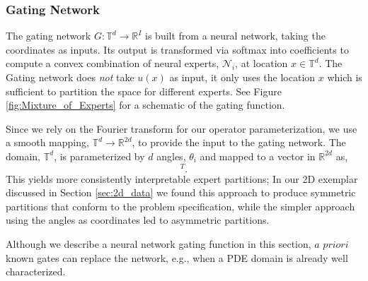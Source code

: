 \subsubsection{Gating Network}\label{sec:gates}

The gating network $G: \mathbb{T}^d \rightarrow \mathbb{R}^I$ is built from a neural network, taking the coordinates as inputs.
Its output is transformed via softmax into coefficients to compute a convex combination of neural experts, \(\mathcal{N}_i\), at location \(x \in \mathbb{T}^d\). The Gating network does \textit{not} take \(u(x)\) as input, it only uses the location \(x\) which is sufficient to partition the space for different experts. See Figure \ref{fig:Mixture_of_Experts} for a schematic of the gating function.



Since we rely on the Fourier transform for our operator parameterization, we use a smooth mapping, $\mathbb{T}^d \rightarrow \mathbb{R}^{2d}$, to provide the input to the gating network. The domain, $\mathbb{T}^d$, is parameterized by $d$ angles, $\theta_i$ and mapped to a vector in $\mathbb{R}^{2d}$ as, 
\begin{equation}
    [\sin(\theta_1), \hdots, \sin(\theta_d),\cos(\theta_1), \hdots, \cos(\theta_d)]^T.
\end{equation}
This yields more consistently interpretable expert partitions; In our 2D exemplar discussed in Section \ref{sec:2d_data} we  found this approach to produce symmetric partitions that conform to the problem specification, while the simpler approach using the angles as coordinates led to asymmetric partitions.

Although we describe a neural network gating function in this section, $\textit{a priori}$ known gates can replace the network, e.g., when a PDE domain is already well characterized.


